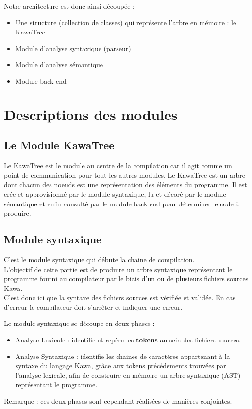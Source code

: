 \documentclass{../res/univ-projet}
\begin{document}
Notre architecture est donc ainsi découpée : 

 \begin{itemize}
	\item   Une structure (collection de classes) qui représente l'arbre en mémoire : le KawaTree
 	\item	Module d'analyse syntaxique (parseur)
	\item   Module d'analyse sémantique
	\item   Module back end
 \end{itemize}

\newpage

\section{Descriptions des modules}

\subsection{Le Module KawaTree}

Le KawaTree est le module au centre de la compilation car il agit comme un point de communication pour tout les autres modules. Le KawaTree est un arbre dont chacun des noeuds est une représentation des éléments du programme. Il est crée et approvisionné par le module syntaxique, lu et décoré par le module sémantique et enfin consulté par le module back end pour déterminer le code à produire.

\subsection{Module syntaxique}
C'est le module syntaxique qui débute la chaine de compilation.\\
L'objectif de cette partie est de produire un arbre syntaxique représentant le programme fourni au compilateur par le biais d'un ou de plusieurs fichiers sources Kawa.\\
C'est donc ici que la syntaxe des fichiers sources est vérifiée et validée. En cas d'erreur le compilateur doit s'arrêter et indiquer une erreur.

Le module syntaxique se découpe en deux phases : 
\begin{itemize}
	\item Analyse Lexicale : identifie et repère les \textbf{tokens} au sein des fichiers sources. 
	\item Analyse Syntaxique : identifie les chaines de caractères appartenant à la syntaxe du langage Kawa, grâce aux tokens précédements trouvées par l'analyse lexicale, afin de construire en mémoire un arbre syntaxique (AST) représentant le programme.
\end{itemize}
Remarque : ces deux phases sont cependant réalisées de manières conjointes.
\end{document}
